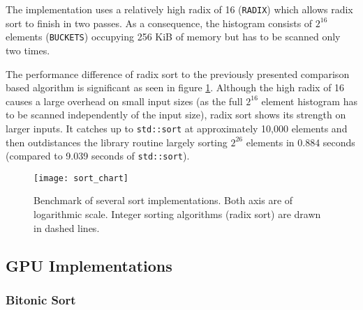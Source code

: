 The implementation uses a relatively high radix of 16 (\lstinline!RADIX!) which allows radix sort to finish in two passes. As a consequence, the histogram consists of $2^{16}$ elements (\lstinline!BUCKETS!) occupying 256 KiB of memory but has to be scanned only two times.

The performance difference of radix sort to the previously presented comparison based algorithm is significant as seen in figure \ref{fig:sort_chart}. Although the high radix of 16 causes a large overhead on small input sizes (as the full $2^{16}$ element histogram has to be scanned independently of the input size), radix sort shows its strength on larger inputs. It catches up to \lstinline!std::sort! at approximately 10,000 elements and then outdistances the library routine largely sorting $2^{26}$ elements in 0.884 seconds (compared to 9.039 seconds of \lstinline!std::sort!).

\begin{figure}[h]
\centering
\texttt{[image: sort\_chart]}
\caption{Benchmark of several sort implementations.
Both axis are of logarithmic scale. Integer sorting algorithms (radix sort) are drawn in dashed lines.}
\label{fig:sort_chart}
\end{figure}

\subsection{GPU Implementations}

\subsubsection{Bitonic Sort}

